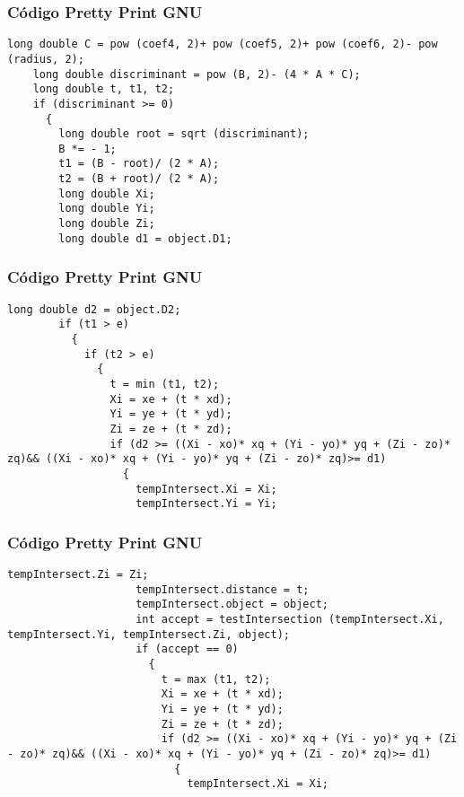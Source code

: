 \documentclass{beamer}
\begin{document}
\begin{frame}[fragile]
\frametitle{C\'odigo Pretty Print GNU}
\begin{lstlisting}[style=CStyle]
    long double C = pow (coef4, 2)+ pow (coef5, 2)+ pow (coef6, 2)- pow (radius, 2);
    long double discriminant = pow (B, 2)- (4 * A * C);
    long double t, t1, t2;
    if (discriminant >= 0)
      {
        long double root = sqrt (discriminant);
        B *= - 1;
        t1 = (B - root)/ (2 * A);
        t2 = (B + root)/ (2 * A);
        long double Xi;
        long double Yi;
        long double Zi;
        long double d1 = object.D1;
\end{lstlisting}
\end{frame}
\begin{frame}[fragile]
\frametitle{C\'odigo Pretty Print GNU}
\begin{lstlisting}[style=CStyle]
        long double d2 = object.D2;
        if (t1 > e)
          {
            if (t2 > e)
              {
                t = min (t1, t2);
                Xi = xe + (t * xd);
                Yi = ye + (t * yd);
                Zi = ze + (t * zd);
                if (d2 >= ((Xi - xo)* xq + (Yi - yo)* yq + (Zi - zo)* zq)&& ((Xi - xo)* xq + (Yi - yo)* yq + (Zi - zo)* zq)>= d1)
                  {
                    tempIntersect.Xi = Xi;
                    tempIntersect.Yi = Yi;
\end{lstlisting}
\end{frame}
\begin{frame}[fragile]
\frametitle{C\'odigo Pretty Print GNU}
\begin{lstlisting}[style=CStyle]
                    tempIntersect.Zi = Zi;
                    tempIntersect.distance = t;
                    tempIntersect.object = object;
                    int accept = testIntersection (tempIntersect.Xi, tempIntersect.Yi, tempIntersect.Zi, object);
                    if (accept == 0)
                      {
                        t = max (t1, t2);
                        Xi = xe + (t * xd);
                        Yi = ye + (t * yd);
                        Zi = ze + (t * zd);
                        if (d2 >= ((Xi - xo)* xq + (Yi - yo)* yq + (Zi - zo)* zq)&& ((Xi - xo)* xq + (Yi - yo)* yq + (Zi - zo)* zq)>= d1)
                          {
                            tempIntersect.Xi = Xi;
\end{lstlisting}
\end{frame}
\end{document}
